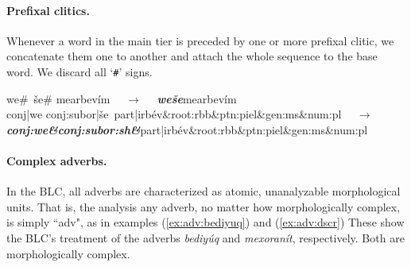
\paragraph{Prefixal clitics.}
Whenever a word in the main tier is preceded by one or more prefixal clitic, we concatenate them one to another and attach the whole sequence to the base word. We discard all `\texttt{\#}' signs.
\begin{exe}\label{ex:preclitics}
	\ex
	\textsf{we\#\, \v{s}e\# mearbev\'im} $\quad\to\quad$ \textbf{\textit{\textsf{we\v{s}e}}}\textsf{mearbev\'im}\\
	\textsf{conj|we conj:subor|\v{s}e\, part|irb\'ev\&root:rbb\&ptn:piel\&gen:ms\&num:pl} $\quad\to\quad$  \\
	\textit{\textbf{\textsf{conj:we\&conj:subor:sh\&}}}\textsf{part|irb\'ev\&root:rbb\&ptn:piel\&gen:ms\&num:pl}
\end{exe}

\paragraph{Complex adverbs.} In the \ac{BLC}, all adverbs are characterized as atomic, unanalyzable morphological units. That is,
the analysis any adverb, no matter how morphologically complex, is simply ``adv", as in 
examples (\ref{ex:adv:bediyuq}) and (\ref{ex:adv:dscr})  These show the \ac{BLC}'s treatment of the adverbs \textit{\textsf{bediy\'{u}q}} and \textit{\textsf{mexoran\'{i}t}}, respectively. Both are 
morphologically complex.

